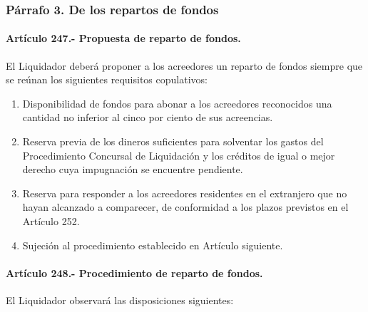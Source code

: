 \documentclass[
]{book}
\begin{document}
\hypertarget{puxe1rrafo-3.-de-los-repartos-de-fondos}{%
\subsubsection*{Párrafo 3. De los repartos de fondos}\label{puxe1rrafo-3.-de-los-repartos-de-fondos}}

\hypertarget{artuxedculo-247.--propuesta-de-reparto-de-fondos.}{%
\paragraph*{Artículo 247.- Propuesta de reparto de fondos.}\label{artuxedculo-247.--propuesta-de-reparto-de-fondos.}}

El Liquidador deberá proponer a los acreedores un reparto de fondos siempre que se reúnan los siguientes requisitos copulativos:

\begin{enumerate}
\def\labelenumi{\arabic{enumi})}
\item
  Disponibilidad de fondos para abonar a los acreedores reconocidos una cantidad no inferior al cinco por ciento de sus acreencias.
\item
  Reserva previa de los dineros suficientes para solventar los gastos del Procedimiento Concursal de Liquidación y los créditos de igual o mejor derecho cuya impugnación se encuentre pendiente.
\item
  Reserva para responder a los acreedores residentes en el extranjero que no hayan alcanzado a comparecer, de conformidad a los plazos previstos en el Artículo 252.
\item
  Sujeción al procedimiento establecido en Artículo siguiente.
\end{enumerate}

\hypertarget{artuxedculo-248.--procedimiento-de-reparto-de-fondos.}{%
\paragraph*{Artículo 248.- Procedimiento de reparto de fondos.}\label{artuxedculo-248.--procedimiento-de-reparto-de-fondos.}}

El Liquidador observará las disposiciones siguientes:
\end{document}
